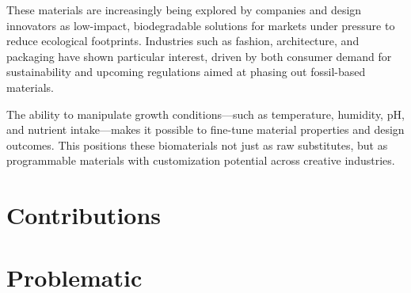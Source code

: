 These materials are increasingly being explored by companies and design innovators as low-impact, biodegradable solutions for markets under pressure to reduce ecological footprints. Industries such as fashion, architecture, and packaging have shown particular interest, driven by both consumer demand for sustainability and upcoming regulations aimed at phasing out fossil-based materials.

The ability to manipulate growth conditions—such as temperature, humidity, pH, and nutrient intake—makes it possible to fine-tune material properties and design outcomes. This positions these biomaterials not just as raw substitutes, but as programmable materials with customization potential across creative industries.

\section{Contributions}




\section{Problematic}